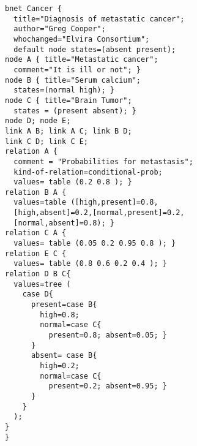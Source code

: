 \begin{small}
\begin{verbatim}
bnet Cancer {
  title="Diagnosis of metastatic cancer";
  author="Greg Cooper";
  whochanged="Elvira Consortium";
  default node states=(absent present);
node A { title="Metastatic cancer";
  comment="It is ill or not"; }
node B { title="Serum calcium";
  states=(normal high); }
node C { title="Brain Tumor";
  states = (present absent); }
node D; node E;
link A B; link A C; link B D;
link C D; link C E;
relation A {
  comment = "Probabilities for metastasis";
  kind-of-relation=conditional-prob;
  values= table (0.2 0.8 ); }
relation B A {
  values=table ([high,present]=0.8,
  [high,absent]=0.2,[normal,present]=0.2,
  [normal,absent]=0.8); }
relation C A {
  values= table (0.05 0.2 0.95 0.8 ); }
relation E C {
  values= table (0.8 0.6 0.2 0.4 ); }
relation D B C{
  values=tree (
    case D{
      present=case B{
        high=0.8;
        normal=case C{
          present=0.8; absent=0.05; }
      }
      absent= case B{
        high=0.2;
        normal=case C{
          present=0.2; absent=0.95; }
      }
    }
  );
}
}
\end{verbatim}
\end{small}
